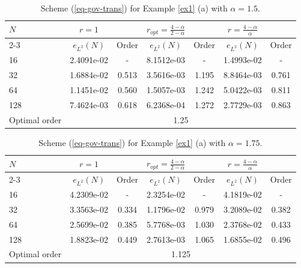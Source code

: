 \documentclass[11pt]{article}
\numberwithin{equation}{section}
\begin{document}
\begin{table}[!ht]
\caption{Scheme (\ref{eq-gov-trans}) for Example \ref{ex1} (a) with $\alpha=1.5$.}
\renewcommand{\arraystretch}{1}
\def\temptablewidth{1\textwidth}
\begin{center}
 \begin{tabular*}{\temptablewidth}{@{\extracolsep{\fill}}lcccccc}\hline
 $N$ & $r=1$   &   &$r_{opt}=\frac{4-\alpha}{2-\alpha}$      &     &$r=\frac{4-\alpha}{\alpha}$  &    \\ 
 \cline{2-3}\cline{4-5}\cline{6-7}
 & $e_{L^{2}}(N)$         &Order     &$e_{L^{2}}(N)$    &Order    &$e_{L^{2}}(N)$ &Order     \\ \hline
 16 &2.4091e-02     &-      &8.1512e-03   &-       &1.4993e-02  &-  \\ 
 32 &1.6884e-02     &0.513  &3.5616e-03   &1.195   &8.8464e-03  &0.761    \\ 
 64 &1.1451e-02     &0.560  &1.5057e-03   &1.242   &5.0422e-03  &0.811 \\ 
 128 &7.4624e-03    &0.618  &6.2368e-04   &1.272   &2.7729e-03  &0.863    \\ 
 Optimal order  &\multicolumn{6}{c}{1.25} \\ \hline
\end{tabular*}
\end{center}
\end{table}

\begin{table}[!ht]
\caption{Scheme (\ref{eq-gov-trans}) for Example \ref{ex1} (a) with $\alpha=1.75$.}
\renewcommand{\arraystretch}{1}
\def\temptablewidth{1\textwidth}
\begin{center}
 \begin{tabular*}{\temptablewidth}{@{\extracolsep{\fill}}lcccccc}\hline
 $N$ & $r=1$   &   &$r_{opt}=\frac{4-\alpha}{2-\alpha}$      &     &$r=\frac{4-\alpha}{\alpha}$  &    \\ 
 \cline{2-3}\cline{4-5}\cline{6-7}
 & $e_{L^{2}}(N)$         &Order     &$e_{L^{2}}(N)$    &Order    &$e_{L^{2}}(N)$ &Order     \\ \hline
 16 &4.2309e-02     &-      &2.3254e-02   &-       &4.1819e-02  &-  \\ 
 32 &3.3563e-02     &0.334  &1.1796e-02   &0.979   &3.2089e-02  &0.382    \\ 
 64 &2.5699e-02     &0.385  &5.7768e-03   &1.030   &2.3768e-02  &0.433 \\ 
 128 &1.8823e-02    &0.449  &2.7613e-03   &1.065   &1.6855e-02  &0.496    \\ 
 Optimal order  &\multicolumn{6}{c}{1.125} \\ \hline
\end{tabular*}
\end{center}
\end{table}
\end{document}
